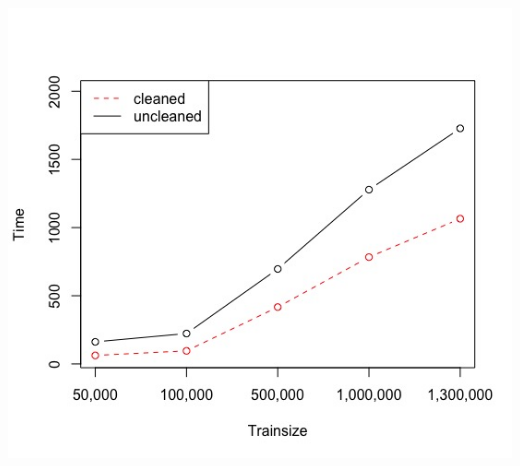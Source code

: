 \documentclass[letterpaper]{article} %
\begin{document}
\begin{center}
\centering
\includegraphics[width=\columnwidth]{../Plots/NBSVM_runtime_sample.jpeg}
\label{fig:runtime_unclean}
\end{center}



\end{document}
